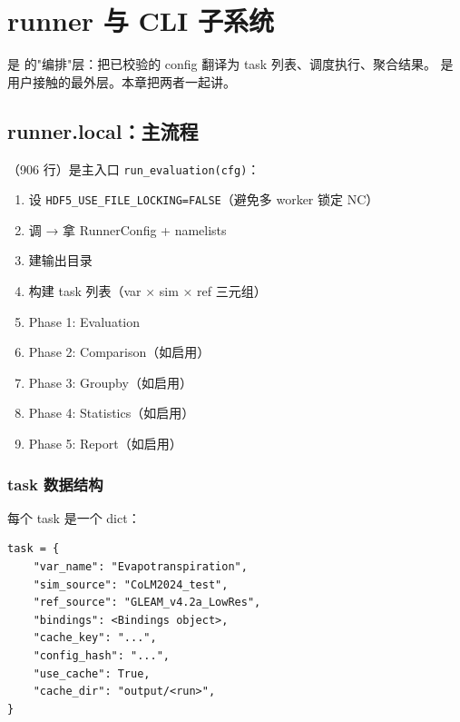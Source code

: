 
\chapter{runner 与 CLI 子系统}

 是 \openbench{} 的"编排"层：把已校验的 config 翻译为 task 列表、调度执行、聚合结果。 是用户接触的最外层。本章把两者一起讲。

\section{runner.local：主流程}

（906 行）是主入口 \texttt{run\_evaluation(cfg)}：

\begin{enumerate}
  \item 设 \texttt{HDF5\_USE\_FILE\_LOCKING=FALSE}（避免多 worker 锁定 NC）
  \item 调  → 拿 RunnerConfig + namelists
  \item 建输出目录 
  \item 构建 task 列表（var × sim × ref 三元组）
  \item Phase 1: Evaluation
  \item Phase 2: Comparison（如启用）
  \item Phase 3: Groupby（如启用）
  \item Phase 4: Statistics（如启用）
  \item Phase 5: Report（如启用）
\end{enumerate}

\subsection{task 数据结构}

每个 task 是一个 dict：

\begin{verbatim}
task = {
    "var_name": "Evapotranspiration",
    "sim_source": "CoLM2024_test",
    "ref_source": "GLEAM_v4.2a_LowRes",
    "bindings": <Bindings object>,
    "cache_key": "...",
    "config_hash": "...",
    "use_cache": True,
    "cache_dir": "output/<run>",
}
\end{verbatim}

